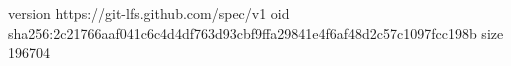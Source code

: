 version https://git-lfs.github.com/spec/v1
oid sha256:2c21766aaf041c6c4d4df763d93cbf9ffa29841e4f6af48d2c57c1097fcc198b
size 196704
